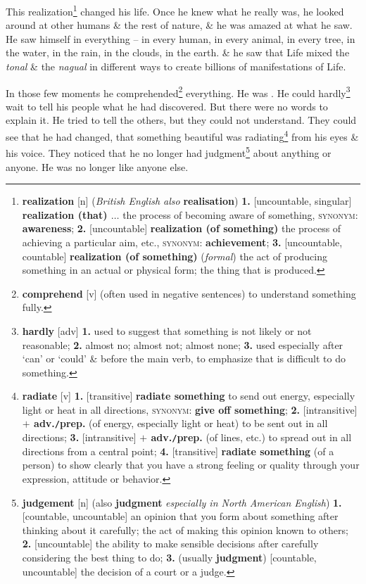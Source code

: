 \documentclass[oneside]{book}
\numberwithin{equation}{section}
\begin{document}
This realization\footnote{\textbf{realization} [n] (\textit{British English also} \textbf{realisation}) \textbf{1.} [uncountable, singular] \textbf{realization (that) $\ldots$} the process of becoming aware of something, \textsc{synonym}: \textbf{awareness}; \textbf{2.} [uncountable] \textbf{realization (of something)} the process of achieving a particular aim, etc., \textsc{synonym}: \textbf{achievement}; \textbf{3.} [uncountable, countable] \textbf{realization (of something)} (\textit{formal}) the act of producing something in an actual or physical form; the thing that is produced.} changed his life. Once he knew what he really was, he looked around at other humans \& the rest of nature, \& he was amazed at what he saw. He saw himself in everything -- in every human, in every animal, in every tree, in the water, in the rain, in the clouds, in the earth. \& he saw that Life mixed the \textit{tonal} \& the \textit{nagual} in different ways to create billions of manifestations of Life.

In those few moments he comprehended\footnote{\textbf{comprehend} [v] (often used in negative sentences) to understand something fully.} everything. He was . He could hardly\footnote{\textbf{hardly} [adv] \textbf{1.} used to suggest that something is not likely or not reasonable; \textbf{2.} almost no; almost not; almost none; \textbf{3.} used especially after `can' or `could' \& before the main verb, to emphasize that is difficult to do something.} wait to tell his people what he had discovered. But there were no words to explain it. He tried to tell the others, but they could not understand. They could see that he had changed, that something beautiful was radiating\footnote{\textbf{radiate} [v] \textbf{1.} [transitive] \textbf{radiate something} to send out energy, especially light or heat in all directions, \textsc{synonym}: \textbf{give off something}; \textbf{2.} [intransitive] \textbf{$+$ adv.\texttt{/}prep.} (of energy, especially light or heat) to be sent out in all directions; \textbf{3.} [intransitive] \textbf{$+$ adv.\texttt{/}prep.} (of lines, etc.) to spread out in all directions from a central point; \textbf{4.} [transitive] \textbf{radiate something} (of a person) to show clearly that you have a strong feeling or quality through your expression, attitude or behavior.} from his eyes \& his voice. They noticed that he no longer had judgment\footnote{\textbf{judgement} [n] (also \textbf{judgment} \textit{especially in North American English}) \textbf{1.} [countable, uncountable] an opinion that you form about something after thinking about it carefully; the act of making this opinion known to others; \textbf{2.} [uncountable] the ability to make sensible decisions after carefully considering the best thing to do; \textbf{3.} (usually \textbf{judgment}) [countable, uncountable] the decision of a court or a judge.} about anything or anyone. He was no longer like anyone else.
\end{document}
